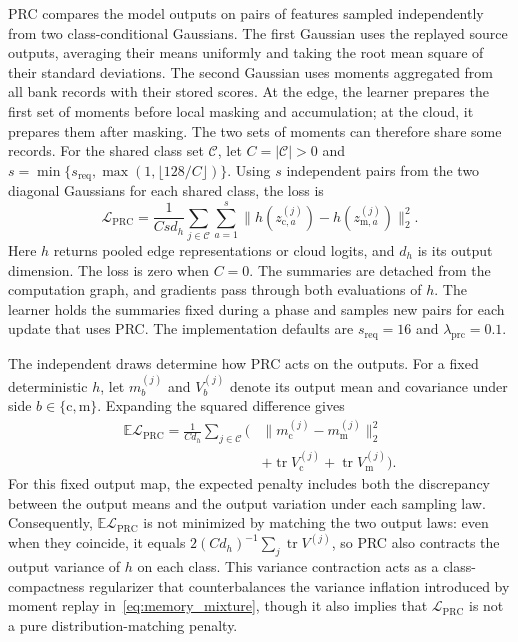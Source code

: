 PRC compares the model outputs on pairs of features sampled independently from two class-conditional Gaussians. The first Gaussian uses the replayed source outputs, averaging their means uniformly and taking the root mean square of their standard deviations. The second Gaussian uses moments aggregated from all bank records with their stored scores. At the edge, the learner prepares the first set of moments before local masking and accumulation; at the cloud, it prepares them after masking. The two sets of moments can therefore share some records. For the shared class set $\mathcal C$, let $C=|\mathcal C|>0$ and
$s=\min\{s_{\mathrm{req}},\max(1,\lfloor128/C\rfloor)\}$.
Using $s$ independent pairs from the two diagonal Gaussians for each shared class, the loss is
\begin{equation}
 \mathcal L_{\mathrm{PRC}}
 =\frac{1}{Csd_h}\sum_{j\in\mathcal C}\sum_{a=1}^{s}
 \|h(z_{\mathrm c,a}^{(j)})-h(z_{\mathrm m,a}^{(j)})\|_2^2 .
 \label{eq:prc_loss}
\end{equation}
Here $h$ returns pooled edge representations or cloud logits, and $d_h$ is its output dimension. The loss is zero when $C=0$. The summaries are detached from the computation graph, and gradients pass through both evaluations of $h$. The learner holds the summaries fixed during a phase and samples new pairs for each update that uses PRC. The implementation defaults are $s_{\mathrm{req}}=16$ and $\lambda_{\mathrm{prc}}=0.1$.

The independent draws determine how PRC acts on the outputs. For a fixed deterministic $h$, let $m_b^{(j)}$ and $V_b^{(j)}$ denote its output mean and covariance under side $b\in\{\mathrm c,\mathrm m\}$. Expanding the squared difference gives
\begin{equation}
\begin{split}
 \mathbb E\mathcal L_{\mathrm{PRC}}
 =\frac{1}{Cd_h}\sum_{j\in\mathcal C}
 \bigl(&\|m_{\mathrm c}^{(j)}-m_{\mathrm m}^{(j)}\|_2^2\\
 &+\operatorname{tr}V_{\mathrm c}^{(j)}
 +\operatorname{tr}V_{\mathrm m}^{(j)}\bigr).
\end{split}
\label{eq:prc_decomp}
\end{equation}
For this fixed output map, the expected penalty includes both the discrepancy between the output means and the output variation under each sampling law. Consequently, $\mathbb E\mathcal L_{\mathrm{PRC}}$ is not minimized by matching the two output laws: even when they coincide, it equals $2(Cd_h)^{-1}\sum_j\operatorname{tr}V^{(j)}$, so PRC also contracts the output variance of $h$ on each class. This variance contraction acts as a class-compactness regularizer that counterbalances the variance inflation introduced by moment replay in~\eqref{eq:memory_mixture}, though it also implies that $\mathcal L_{\mathrm{PRC}}$ is not a pure distribution-matching penalty.

